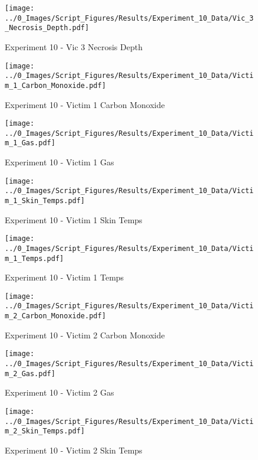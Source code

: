 	\clearpage

	\begin{figure}[H]
		\centering
		\texttt{[image: ../0\_Images/Script\_Figures/Results/Experiment\_10\_Data/Vic\_3\_Necrosis\_Depth.pdf]}
		\caption[]{Experiment 10 - Vic 3 Necrosis Depth}
	\end{figure}
 

	\begin{figure}[H]
		\centering
		\texttt{[image: ../0\_Images/Script\_Figures/Results/Experiment\_10\_Data/Victim\_1\_Carbon\_Monoxide.pdf]}
		\caption[]{Experiment 10 - Victim 1 Carbon Monoxide}
	\end{figure}
 
	\clearpage

	\begin{figure}[H]
		\centering
		\texttt{[image: ../0\_Images/Script\_Figures/Results/Experiment\_10\_Data/Victim\_1\_Gas.pdf]}
		\caption[]{Experiment 10 - Victim 1 Gas}
	\end{figure}
 

	\begin{figure}[H]
		\centering
		\texttt{[image: ../0\_Images/Script\_Figures/Results/Experiment\_10\_Data/Victim\_1\_Skin\_Temps.pdf]}
		\caption[]{Experiment 10 - Victim 1 Skin Temps}
	\end{figure}
 
	\clearpage

	\begin{figure}[H]
		\centering
		\texttt{[image: ../0\_Images/Script\_Figures/Results/Experiment\_10\_Data/Victim\_1\_Temps.pdf]}
		\caption[]{Experiment 10 - Victim 1 Temps}
	\end{figure}
 

	\begin{figure}[H]
		\centering
		\texttt{[image: ../0\_Images/Script\_Figures/Results/Experiment\_10\_Data/Victim\_2\_Carbon\_Monoxide.pdf]}
		\caption[]{Experiment 10 - Victim 2 Carbon Monoxide}
	\end{figure}
 
	\clearpage

	\begin{figure}[H]
		\centering
		\texttt{[image: ../0\_Images/Script\_Figures/Results/Experiment\_10\_Data/Victim\_2\_Gas.pdf]}
		\caption[]{Experiment 10 - Victim 2 Gas}
	\end{figure}
 

	\begin{figure}[H]
		\centering
		\texttt{[image: ../0\_Images/Script\_Figures/Results/Experiment\_10\_Data/Victim\_2\_Skin\_Temps.pdf]}
		\caption[]{Experiment 10 - Victim 2 Skin Temps}
	\end{figure}
 
